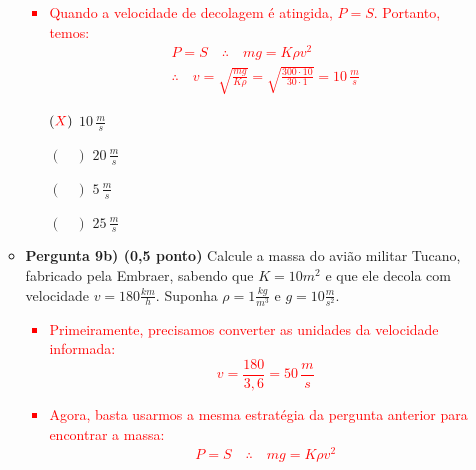 \documentclass[a4paper, 12pt]{article}
\newcommand{\red}[1]{\textcolor{red}{#1}}
\begin{document}
\begin{flushleft}
\begin{itemize}
\begin{itemize}
                        \red{\begin{itemize}
                            \item Quando a velocidade de decolagem é atingida, $P=S$. Portanto, temos:
                                \begin{equation*} \begin{gathered}
                                    P=S \quad \therefore \quad mg=K\rho v^2\\
                                    \therefore \quad v=\sqrt{\frac{mg}{K \rho}}=\sqrt{\frac{300 \cdot 10}{30 \cdot 1}} = 10 \, \frac{m}{s}
                                \end{gathered} \end{equation*}
                        \end{itemize}}
                        \begin{itemize}
                            \item[$(\red{X})$] $10 \, \frac{m}{s}$
                            \item[$(\quad)$] $20 \, \frac{m}{s}$
                            \item[$(\quad)$] $5 \, \frac{m}{s}$
                            \item[$(\quad)$] $25 \, \frac{m}{s}$
                        \end{itemize}
                    \item \textbf{Pergunta 9b) (0,5 ponto)} Calcule a massa do avião militar Tucano, fabricado pela Embraer, sabendo que $K = 10 m^2$ e que ele decola com velocidade $v = 180 \frac{km}{h}$. Suponha $\rho = 1 \frac{kg}{m^3}$ e $g = 10 \frac{m}{s^2}$.
                        \red{\begin{itemize}
                            \item Primeiramente, precisamos converter as unidades da velocidade informada:
                                \begin{equation*}
                                    v=\frac{180}{3,6}=50 \, \frac{m}{s}
                                \end{equation*}
                            \item Agora, basta usarmos a mesma estratégia da pergunta anterior para encontrar a massa:
                                \begin{equation*} \begin{gathered}
                                    P=S \quad \therefore \quad mg=K\rho v^2\\

\end{gathered}
\end{equation*}
\end{itemize}}
\end{itemize}
\end{itemize}
\end{flushleft}
\end{document}
